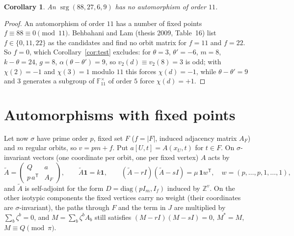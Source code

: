 \documentclass[11pt,a4paper]{article}
\newtheorem{corollary}[theorem]{Corollary}
\theoremstyle{remark}
\newcommand{\Z}{\mathbb{Z}}
\newcommand{\F}{\mathbb{F}}
\newcommand{\one}{\mathbf{1}}
\newcommand{\srg}{\operatorname{srg}}
\begin{document}
\begin{corollary}\label{cor:88}
An $\srg(88,27,6,9)$ has no automorphism of order $11$.
\end{corollary}
\begin{proof}
An automorphism of order $11$ has a number of fixed points $f\equiv88\equiv0\pmod{11}$. Behbahani and Lam (thesis 2009,
Table~16) list $f\in\{0,11,22\}$ as the candidates and find no orbit matrix for $f=11$ and $f=22$. So $f=0$, which
Corollary~\ref{cor:test} excludes: for $\theta=3$, $\theta'=-6$, $m=8$, $k-\theta=24$, $g=8$, $\alpha(\theta-\theta')=9$, so
$v_2(d)\equiv v_2(8)=3$ is odd; with $\chi(2)=-1$ and $\chi(3)=1$ modulo $11$ this forces $\chi(d)=-1$, while
$\theta-\theta'=9$ and $3$ generates a subgroup of $\F_{11}^\times$ of order $5$ force $\chi(d)=+1$.
\end{proof}

\section{Automorphisms with fixed points}\label{sec:fix}

Let now $\sigma$ have prime order $p$, fixed set $F$ ($f=|F|$, induced adjacency matrix $A_F$) and $m$ regular orbits, so
$v=pm+f$. Put $a[U,t]=A(x_U,t)$ for $t\in F$. On $\sigma$-invariant vectors (one coordinate per orbit, one per fixed vertex) $A$
acts by
\[
\tilde A=\begin{pmatrix}Q& a\\ p\,a^{\mathsf T}& A_F\end{pmatrix},\qquad \tilde A\one=k\one,\qquad
(\tilde A-rI)(\tilde A-sI)=\mu\,\one w^{\mathsf T},\quad w=(p,\dots,p,1,\dots,1),
\]
and $\tilde A$ is self-adjoint for the form $D=\mathrm{diag}(pI_m,I_f)$ induced by $\Z^v$. On the other isotypic components the
fixed vertices carry no weight (their coordinates are $\sigma$-invariant), the paths through $F$ and the term in $J$ are multiplied by
$\sum_b\zeta^b=0$, and $M=\sum_b\zeta^bA_b$ still satisfies $(M-rI)(M-sI)=0$, $M^*=M$, $M\equiv Q\pmod\pi$.
\end{document}
